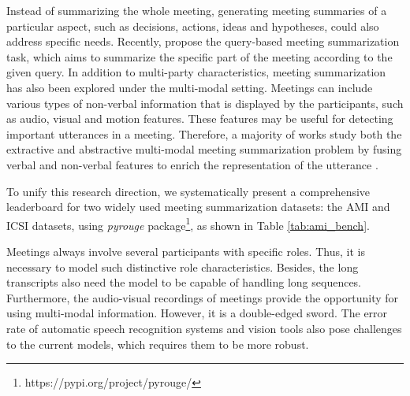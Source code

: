 Instead of summarizing the whole meeting, generating meeting summaries of a particular aspect, such as decisions, actions, ideas and hypotheses, could also address specific needs.
Recently,  propose the query-based meeting summarization task, which aims to summarize the specific part of the meeting according to the given query.
In addition to multi-party characteristics, meeting summarization has also been explored under the multi-modal setting. Meetings can include various types of non-verbal information that is displayed by the participants, such as audio, visual and motion features.
These features may be useful for detecting important utterances in a meeting.
Therefore, a majority of works study both the extractive and abstractive multi-modal meeting summarization problem by fusing verbal and non-verbal features to enrich the representation of the utterance .

To unify this research direction, we systematically present a comprehensive leaderboard for two widely used meeting summarization datasets: the AMI and ICSI datasets, using \textit{pyrouge} package\footnote{https://pypi.org/project/pyrouge/}, as shown in Table \ref{tab:ami_bench}.

Meetings always involve several participants with specific roles. Thus, it is necessary to model such distinctive role characteristics. 
Besides, the long transcripts also need the model to be capable of handling long sequences. 
Furthermore, the audio-visual recordings of meetings provide the opportunity for using multi-modal information. 
However, it is a double-edged sword. The error rate of automatic speech recognition systems and vision tools also pose challenges to the current models, which requires them to be more robust.

